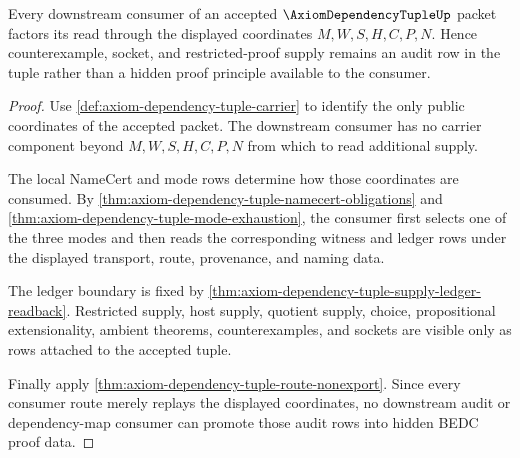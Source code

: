 \begin{theorem}
\label{thm:axiom-dependency-tuple-downstream-consumer-supply-boundary}
Every downstream consumer of an accepted $\AxiomDependencyTupleUp$ packet
factors its read through the displayed coordinates $M,W,S,H,C,P,N$. Hence
counterexample, socket, and restricted-proof supply remains an audit row in
the tuple rather than a hidden proof principle available to the consumer.
\end{theorem}
\begin{proof}
Use \autoref{def:axiom-dependency-tuple-carrier} to identify the only public
coordinates of the accepted packet. The downstream consumer has no carrier
component beyond $M,W,S,H,C,P,N$ from which to read additional supply.

The local NameCert and mode rows determine how those coordinates are consumed.
By \autoref{thm:axiom-dependency-tuple-namecert-obligations} and
\autoref{thm:axiom-dependency-tuple-mode-exhaustion}, the consumer first
selects one of the three modes and then reads the corresponding witness and
ledger rows under the displayed transport, route, provenance, and naming data.

The ledger boundary is fixed by
\autoref{thm:axiom-dependency-tuple-supply-ledger-readback}. Restricted supply,
host supply, quotient supply, choice, propositional extensionality, ambient
theorems, counterexamples, and sockets are visible only as rows attached to the
accepted tuple.

Finally apply \autoref{thm:axiom-dependency-tuple-route-nonexport}. Since every
consumer route merely replays the displayed coordinates, no downstream audit
or dependency-map consumer can promote those audit rows into hidden BEDC proof
data.
\end{proof}


